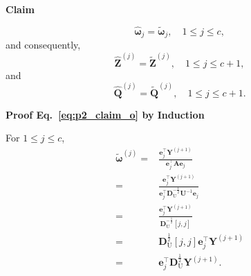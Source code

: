 \documentclass{article} %
\begin{document}
\textbf{Claim}

\begin{equation}
\hat{\bm{\omega}}_{j} = \tilde{\bm{\omega}}_{j}, \quad 1 \le j \le c ,
\label{eq:p2_claim_o}
\end{equation}
and consequently,
\begin{equation}
\hat{\bm{Z}}^{(j)} = \tilde{\bm{Z}}^{(j)}, \quad 1 \le j \le c+1 ,
\label{eq:p2_claim_z}
\end{equation}
and
\begin{equation}
\hat{\bm{Q}}^{(j)} = \tilde{\bm{Q}}^{(j)}, \quad 1 \le j \le c+1 .
\label{eq:p2_claim_q}
\end{equation}

\textbf{Proof Eq.~\ref{eq:p2_claim_o} by Induction}

For $1 \le j \le c$,
\begin{equation}
\begin{aligned}
\tilde{\bm{\omega}}^{(j)}
= & \frac{\mathbf{e}_{j}^\top \bm{Y}^{(j+1)}}{\mathbf{e}_{j}^\top \bm{A} \mathbf{e}_{j}} \\
= & \frac{\mathbf{e}_{j}^\top \bm{Y}^{(j+1)}}{\mathbf{e}_{j}^\top \bm{D}_{\mathrm{U}}^{-\frac{1}{2}} \bm{U}^{-1} \mathbf{e}_{j}} \\
= & \frac{\mathbf{e}_{j}^\top \bm{Y}^{(j+1)}}{\bm{D}_{\mathrm{U}}^{-\frac{1}{2}} [j,j]} \\
= & \bm{D}_{\mathrm{U}}^{\frac{1}{2}} [j,j] \mathbf{e}_{j}^\top \bm{Y}^{(j+1)} \\
= & \mathbf{e}_{j}^\top \bm{D}_{\mathrm{U}}^{\frac{1}{2}} \bm{Y}^{(j+1)} .
\end{aligned}
\label{eq:p2_ot}
\end{equation}
\end{document}
